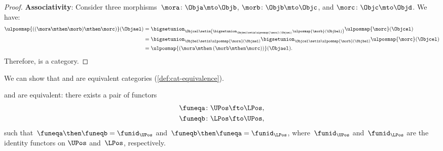 \begin{proof}
    \textbf{Associativity}:
    Consider three morphisms~$\mora\colon \Obja \mto \Objb$, $\morb\colon \Objb\mto \Objc$, and $\morc \colon \Objc\mto \Objd$.
    We have:
    \begin{equation}
        \begin{aligned}
            \ulposmap{\left( (\mora \mthen \morb) \mthen \morc\right)}(\Objael) & =
            \bigsetunion_{\Objcel \setin \left( \bigsetunion_{\Objbel \setin \ulposmap{\mora}(\Objael)}\ulposmap{\morb}(\Objbel)\right)}\ulposmap{\morc}(\Objcel) \\
                                                                                & =\bigsetunion_{\Objbel\setin \ulposmap{\mora}(\Objael)}\bigsetunion_{\Objcel\setin \ulposmap{\morb}(\Objbel)}\ulposmap{\morc}(\Objcel) \\
                                                                                & =\ulposmap{\left( \mora \mthen \left( \morb\mthen \morc\right)\right)}(\Objael).
        \end{aligned}
    \end{equation}
    Therefore, \UPos is a category.
\end{proof}

We can show that \UPos and \LPos are equivalent categories (\cref{def:cat-equivalence}).

\begin{lemma}
    \label{lem:ulposequiv}
    \UPos and \LPos are equivalent: there exists a pair of functors
    \begin{equation}
        \begin{aligned}
            \funeqa\colon \UPos & \fto \LPos, \\
            \funeqb\colon \LPos & \fto \UPos,
        \end{aligned}
    \end{equation}
    such that~$\funeqa \then \funeqb=\funid_{\UPos}$ and~$\funeqb \then \funeqa=\funid_{\LPos}$, where~$\funid_{\UPos}$ and~$\funid_{\LPos}$ are the identity functors on $\UPos$ and~$\LPos$, respectively.
\end{lemma}

